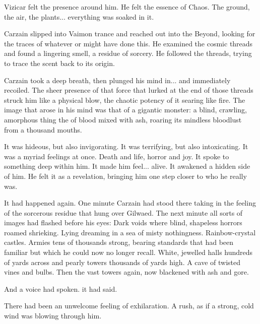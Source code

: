 Vizicar felt the \daemonic{} presence around him. 
He felt the essence of Chaos. 
The ground, the air, the plants... everything was soaked in it. 


Carzain slipped into Vaimon trance and reached out into the Beyond, looking for the traces of whatever \qliphoth{} or \daemons{} might have done this. 
He examined the cosmic threads and found a lingering smell, a residue of sorcery. 
He followed the threads, trying to trace the scent back to its origin. 


Carzain took a deep breath, then plunged his mind in... and immediately recoiled. 
The sheer presence of that force that lurked at the end of those threads struck him like a physical blow, the chaotic potency of it searing like fire. 
The image that arose in his mind was that of a gigantic monster: 
a blind, crawling, amorphous thing the \colour of blood mixed with ash, roaring its mindless bloodlust from a thousand mouths. 

It was hideous, but also invigorating. 
It was terrifying, but also intoxicating. 
It was a myriad feelings at once. 
Death and life, horror and joy. 
It spoke to something deep within him. 
It made him feel... alive. 
It awakened a hidden side of him. 
He felt it as a revelation, bringing him one step closer to who he really was. 

It had happened again. 
One minute Carzain had stood there taking in the feeling of the sorcerous residue that hung over Gilwaed. 
The next minute all sorts of images had flashed before his eyes: 
Dark voids where blind, shapeless horrors roamed shrieking. 
Lying dreaming in a sea of misty nothingness. 
Rainbow-\coloured crystal castles. 
Armies tens of thousands strong, bearing standards that had been familiar but which he could now no longer recall. 
White, jewelled halls hundreds of yards across and pearly towers thousands of yards high. 
A cave of twisted vines and bulbs. 
Then the vast towers again, now blackened with ash and gore. 

And a voice had spoken. 
{} it had said. 
{}

There had been an unwelcome feeling of exhilaration. 
A rush, as if a strong, cold wind was blowing through him. 

